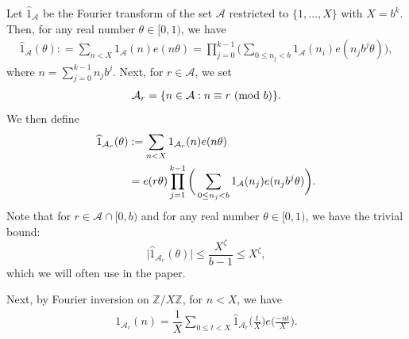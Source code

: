 \documentclass[12pt]{amsart}
\numberwithin{equation}{section}
\theoremstyle{remark}
\theoremstyle{definition}
\newcommand{\imod}[1]{\ (\mathrm{mod}\ #1)}
\begin{document}
Let $\widehat{{1}}_{\mathcal{A}}$ be the Fourier transform of the set $\mathcal{A}$ restricted to $\{1, \dotsc, X\}$ with $X=b^k$. Then, for any real number $\theta\in [0, 1)$, we have
\begin{align}\label{Afourier}
\widehat{{1}}_{\mathcal{A}}(\theta): =\sum_{n<X}{1}_{\mathcal{A}}(n)e(n\theta) = \prod_{j=0}^{k-1}\bigg(\sum_{0\leq n_j<b}{1}_{\mathcal{A}}(n_i)e(n_jb^j \theta)\bigg),
\end{align}
where $n=\sum_{j=0}^{k-1}n_jb^j$. Next, for $r\in \mathcal{A}$, we set
\begin{align}
\notag \mathcal{A}_r=\{n\in \mathcal{A}:n\equiv r\imod b\}.
\end{align}
We then define 
\begin{align}
\label{Arfourier}\widehat{1}_{\mathcal{A}_r}(\theta)&:=\sum_{n<X}{1}_{\mathcal{A}_r}(n)e(n\theta)\\
\notag &=e(r\theta)\prod_{j=1}^{k-1}\bigg(\sum_{0\leq n_j<b}{1}_{\mathcal{A}}(n_j)e(n_jb^j \theta)\bigg).
\end{align}
Note that for $r\in \mathcal{A} \cap[0, b)$ and for any real number $\theta\in [0, 1)$, we have the trivial bound:
\[\big|\widehat{1}_{\mathcal{A}_r}(\theta)\big| \leq \dfrac{X^\zeta}{b-1} \leq X^\zeta,\]
which we will often use in the paper.

Next, by Fourier inversion on $\mathbb{Z}/X\mathbb{Z}$, for $n<X$, we have
\begin{align}
\label{fourinv} {1}_{\mathcal{A}_r}(n) = \dfrac{1}{X}\sum_{0\leq t < X}\widehat{{1}}_{\mathcal{A}_r}\bigg(\frac{t}{X}\bigg)e\bigg(\frac{-nt}{X}\bigg).
\end{align}
\end{document}
